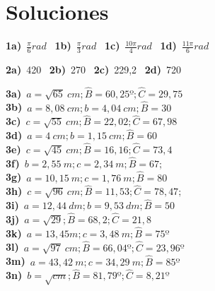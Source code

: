 \clearpage
\newpage
\section{Soluciones}
\textbf{1a)}~$\frac{\pi}{6} rad $~
\textbf{1b)}~$\frac{\pi}{3} rad$~
\textbf{1c)}~$\frac{10\pi}{4} rad $~
\textbf{1d)}~$\frac{11\pi}{6} rad $

\textbf{2a)}~420\textdegree~
\textbf{2b)}~270\textdegree~
\textbf{2c)}~229,2\textdegree~
\textbf{2d)}~720\textdegree

\textbf{3a)}~$a=\sqrt{65}~cm;\widehat{B}=60,25º;\widehat{C}=29,75$ \\
\textbf{3b)}~$a=8,08~cm; b=4,04~cm; \widehat{B}=30$ \\
\textbf{3c)}~$c=\sqrt{55}~cm; \widehat{B}=22,02; \widehat{C}= 67,98$ \\
\textbf{3d)}~$a=4~cm;b=1,15~cm; \widehat{B}=60$ \\
\textbf{3e)}~$c=\sqrt{45}~cm; \widehat{B}=16,16;\widehat{C}=73,4$ \\
\textbf{3f)}~$b=2,55~m; c=2,34~m; \widehat{B}=67;$ \\
\textbf{3g)}~$a=10,15~m;c=1,76~m; \widehat{B}=80$ \\
\textbf{3h)}~$c=\sqrt{96}~cm; \widehat{B}=11,53 ;\widehat{C}=78,47;$ \\
\textbf{3i)}~$a=12,44~dm;b=9,53~dm;\widehat{B}=50$ \\
\textbf{3j)}~$a=\sqrt{29}; \widehat{B}=68,2; \widehat{C}=21,8$ \\
\textbf{3k)}~$a=13,45m;c=3,48~m; \widehat{B}=75º$ \\
\textbf{3l)}~$a=\sqrt{97}~cm; \widehat{B}=66,04º;\widehat{C}=23,96º$ \\
\textbf{3m)}~$a=43,42~m; c=34,29~m; \widehat{B}= 85º$ \\
\textbf{3n)}~$b=\sqrt{cm}; \widehat{B}=81,79º;\widehat{C}=8,21º$

